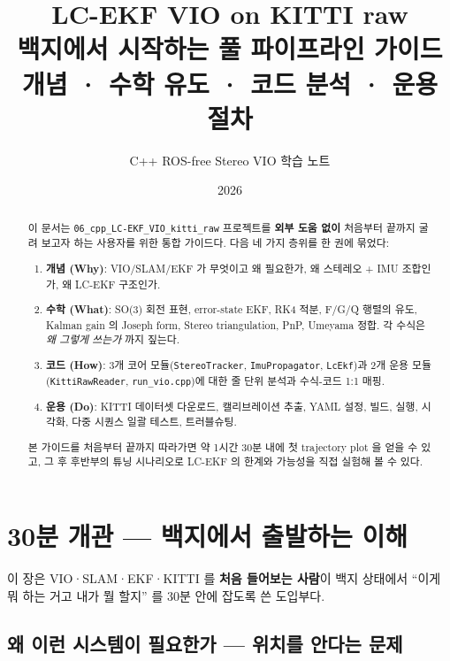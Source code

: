 \documentclass[11pt,a4paper,oneside]{report}
\title{\textbf{LC-EKF VIO on KITTI raw}\\[0.3em]
\large 백지에서 시작하는 풀 파이프라인 가이드 \\
\large {\small 개념 · 수학 유도 · 코드 분석 · 운용 절차}}
\author{C++ ROS-free Stereo VIO 학습 노트}
\date{2026}
\begin{document}
\maketitle

\begin{abstract}
\noindent
이 문서는 \texttt{06\_cpp\_LC-EKF\_VIO\_kitti\_raw} 프로젝트를 \textbf{외부 도움 없이} 처음부터 끝까지 굴려 보고자 하는 사용자를 위한 통합 가이드다. 다음 네 가지 층위를 한 권에 묶었다:

\begin{enumerate}
\item \textbf{개념 (Why)}: VIO/SLAM/EKF 가 무엇이고 왜 필요한가, 왜 스테레오 + IMU 조합인가, 왜 LC-EKF 구조인가.
\item \textbf{수학 (What)}: SO(3) 회전 표현, error-state EKF, RK4 적분, F/G/Q 행렬의 유도, Kalman gain 의 Joseph form, Stereo triangulation, PnP, Umeyama 정합. 각 수식은 \emph{왜 그렇게 쓰는가} 까지 짚는다.
\item \textbf{코드 (How)}: 3개 코어 모듈(\texttt{StereoTracker}, \texttt{ImuPropagator}, \texttt{LcEkf})과 2개 운용 모듈(\texttt{KittiRawReader}, \texttt{run\_vio.cpp})에 대한 줄 단위 분석과 수식-코드 1:1 매핑.
\item \textbf{운용 (Do)}: KITTI 데이터셋 다운로드, 캘리브레이션 추출, YAML 설정, 빌드, 실행, 시각화, 다중 시퀀스 일괄 테스트, 트러블슈팅.
\end{enumerate}

본 가이드를 처음부터 끝까지 따라가면 약 1시간 30분 내에 첫 trajectory plot 을 얻을 수 있고, 그 후 후반부의 튜닝 시나리오로 LC-EKF 의 한계와 가능성을 직접 실험해 볼 수 있다.
\end{abstract}

\tableofcontents
\clearpage

\chapter{30분 개관 — 백지에서 출발하는 이해}

이 장은 VIO·SLAM·EKF·KITTI 를 \textbf{처음 들어보는 사람}이 백지 상태에서 ``이게 뭐 하는 거고 내가 뭘 할지'' 를 30분 안에 잡도록 쓴 도입부다.

\section{왜 이런 시스템이 필요한가 — 위치를 안다는 문제}
\end{document}
